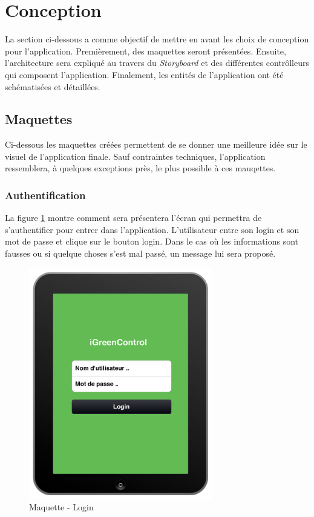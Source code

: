 
\section{Conception}
\label{section:conception_client}
La section ci-dessous a comme objectif de mettre en avant les choix de conception pour l'application. Premièrement, des maquettes seront présentées. Ensuite, l'architecture sera expliqué au travers du \emph{Storyboard} et des différentes contrôlleurs qui composent l'application. Finalement, les entités de l'application ont été schématisées et détaillées.

\subsection{Maquettes} %
\label{sub:maquettes}

Ci-dessous les maquettes créées permettent de se donner une meilleure idée sur le visuel de l'application finale. Sauf contraintes techniques, l'application ressemblera, à quelques exceptions près, le plus possible à ces mauqettes.

\subsubsection{Authentification}
La figure \ref{gra:maqLogin} montre comment sera présentera l'écran qui permettra de s'authentifier pour entrer dans l'application. L'utilisateur entre son login et son mot de passe et clique sur le bouton login. Dans le cas où les informations sont fausses ou si quelque choses s'est mal passé, un message lui sera proposé.
\begin{figure}[H]
      \centering
      \includegraphics[width=8cm]{00_media/04_Maquette_00.pdf}
      \caption{Maquette - Login}
      \label{gra:maqLogin}
\end{figure}
